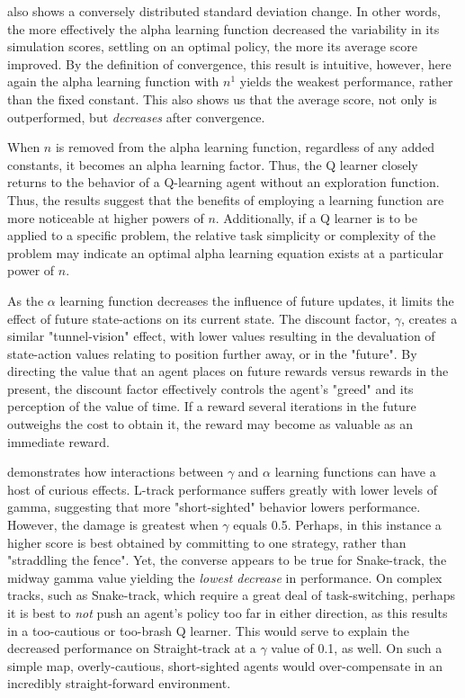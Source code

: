 \documentclass[12pt, letter]{article}
\begin{document}
 also shows a conversely distributed standard deviation change.  In other words, the more effectively the alpha learning function decreased the variability in its simulation scores, settling on an optimal policy, the more its average score improved.  By the definition of convergence, this result is intuitive\cite{textbook}, however, here again the alpha learning function with $n^1$ yields the weakest performance, rather than the fixed constant.  This also shows us that the average score, not only is outperformed, but \emph{decreases} after convergence.

When $n$ is removed from the alpha learning function, regardless of any added constants, it becomes an alpha learning factor.  Thus, the Q learner closely returns to the behavior of a Q-learning agent without an exploration function.  Thus, the results suggest that the benefits of employing a learning function are more noticeable at higher powers of $n$.  Additionally, if a Q learner is to be applied to a specific problem, the relative task simplicity or complexity of the problem may indicate an optimal alpha learning equation exists at a particular power of $n$.

As the $\alpha$ learning function decreases the influence of future updates, it limits the effect of future state-actions on its current state.  The discount factor, $\gamma$,  creates a similar "tunnel-vision" effect, with lower values resulting in the devaluation of state-action values relating to position further away, or in the "future".  By directing the value that an agent places on future rewards versus rewards in the present, the discount factor effectively controls the agent's "greed"\cite{textbook} and its perception of the value of time.  If a reward several iterations in the future outweighs the cost to obtain it, the reward may become as valuable as an immediate reward.

 demonstrates how interactions between $\gamma$ and $\alpha$ learning functions can have a host of curious effects.  L-track performance suffers greatly with lower levels of gamma, suggesting that more "short-sighted" behavior lowers performance.  However, the damage is greatest when $\gamma$ equals 0.5.  Perhaps, in this instance a higher score is best obtained by committing to one strategy, rather than "straddling the fence".  Yet, the converse appears to be true for Snake-track, the midway gamma value yielding the \emph{lowest decrease} in performance.  On complex tracks, such as Snake-track, which require a great deal of task-switching, perhaps it is best to \emph{not} push an agent's policy too far in either direction, as this results in a too-cautious or too-brash Q learner.  This would serve to explain the decreased performance on Straight-track at a $\gamma$ value of 0.1, as well.  On such a simple map, overly-cautious, short-sighted agents would over-compensate in an incredibly straight-forward environment.
\end{document}
